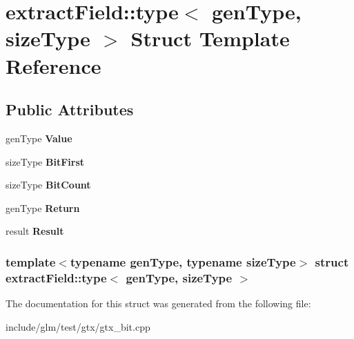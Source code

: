 \hypertarget{structextractField_1_1type}{\section{extract\-Field\-:\-:type$<$ gen\-Type, size\-Type $>$ \-Struct \-Template \-Reference}
\label{structextractField_1_1type}
}
\subsection*{\-Public \-Attributes}
\begin{DoxyCompactItemize}
\item 
\hypertarget{structextractField_1_1type_a5d396fcf1be27cc259af6e1a4784e128}{gen\-Type {\bfseries \-Value}}\label{structextractField_1_1type_a5d396fcf1be27cc259af6e1a4784e128}

\item 
\hypertarget{structextractField_1_1type_abf02bce5639be89fd52ad7adab00a757}{size\-Type {\bfseries \-Bit\-First}}\label{structextractField_1_1type_abf02bce5639be89fd52ad7adab00a757}

\item 
\hypertarget{structextractField_1_1type_a4bc0af61b55e9eb2551f10001df247c6}{size\-Type {\bfseries \-Bit\-Count}}\label{structextractField_1_1type_a4bc0af61b55e9eb2551f10001df247c6}

\item 
\hypertarget{structextractField_1_1type_ab6cb1a632e0d08e4c9d9856c8014a160}{gen\-Type {\bfseries \-Return}}\label{structextractField_1_1type_ab6cb1a632e0d08e4c9d9856c8014a160}

\item 
\hypertarget{structextractField_1_1type_ad2e22f042c136f103c0561785fbd837a}{result {\bfseries \-Result}}\label{structextractField_1_1type_ad2e22f042c136f103c0561785fbd837a}

\end{DoxyCompactItemize}
\subsubsection*{template$<$typename gen\-Type, typename size\-Type$>$ struct extract\-Field\-::type$<$ gen\-Type, size\-Type $>$}



\-The documentation for this struct was generated from the following file\-:\begin{DoxyCompactItemize}
\item 
include/glm/test/gtx/gtx\-\_\-bit.\-cpp\end{DoxyCompactItemize}
